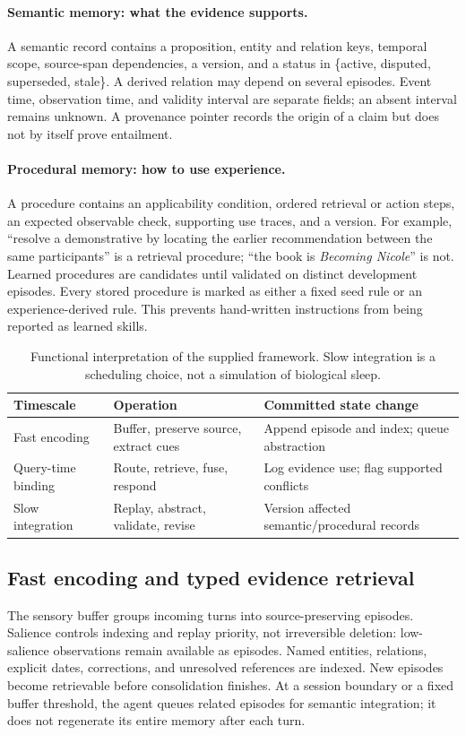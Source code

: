 \documentclass{article}
\begin{document}
\paragraph{Semantic memory: what the evidence supports.}
A semantic record contains a proposition, entity and relation keys, temporal
scope, source-span dependencies, a version, and a status in
\{active, disputed, superseded, stale\}. A derived relation may depend on
several episodes. Event time, observation time, and validity interval are
separate fields; an absent interval remains unknown. A provenance pointer
records the origin of a claim but does not by itself prove entailment.

\paragraph{Procedural memory: how to use experience.}
A procedure contains an applicability condition, ordered retrieval or action
steps, an expected observable check, supporting use traces, and a version.
For example, ``resolve a demonstrative by locating the earlier recommendation
between the same participants'' is a retrieval procedure; ``the book is
\emph{Becoming Nicole}'' is not. Learned procedures are candidates until
validated on distinct development episodes. Every stored procedure is marked
as either a fixed seed rule or an experience-derived rule. This prevents
hand-written instructions from being reported as learned skills.

\begin{table}[t]
\centering\small
\begin{tabularx}{\textwidth}{@{}lXX@{}}
\toprule
Timescale & Operation & Committed state change \\
\midrule
Fast encoding & Buffer, preserve source, extract cues & Append episode and index; queue abstraction \\
Query-time binding & Route, retrieve, fuse, respond & Log evidence use; flag supported conflicts \\
Slow integration & Replay, abstract, validate, revise & Version affected semantic/procedural records \\
\bottomrule
\end{tabularx}
\caption{Functional interpretation of the supplied framework. Slow integration
is a scheduling choice, not a simulation of biological sleep.}
\label{tab:timescales}
\end{table}

\subsection{Fast encoding and typed evidence retrieval}
The sensory buffer groups incoming turns into source-preserving episodes.
Salience controls indexing and replay priority, not irreversible deletion:
low-salience observations remain available as episodes. Named entities,
relations, explicit dates, corrections, and unresolved references are indexed.
New episodes become retrievable before consolidation finishes. At a session
boundary or a fixed buffer threshold, the agent queues related episodes for
semantic integration; it does not regenerate its entire memory after each turn.
\end{document}
